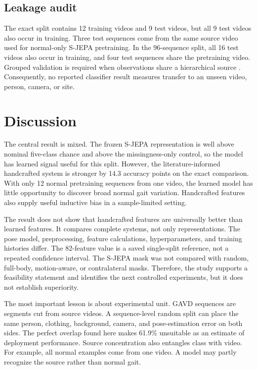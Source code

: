 \documentclass[conference]{IEEEtran}
\begin{document}
\subsection{Leakage audit}
The exact split contains 12 training videos and 9 test videos, but all 9 test videos also occur in training. Three test sequences come from the same source video used for normal-only S-JEPA pretraining. In the 96-sequence split, all 16 test videos also occur in training, and four test sequences share the pretraining video. Grouped validation is required when observations share a hierarchical source \cite{roberts2017crossvalidation}. Consequently, no reported classifier result measures transfer to an unseen video, person, camera, or site.

\section{Discussion}
The central result is mixed. The frozen S-JEPA representation is well above nominal five-class chance and above the missingness-only control, so the model has learned signal useful for this split. However, the literature-informed handcrafted system is stronger by 14.3 accuracy points on the exact comparison. With only 12 normal pretraining sequences from one video, the learned model has little opportunity to discover broad normal gait variation. Handcrafted features also supply useful inductive bias in a sample-limited setting.

The result does not show that handcrafted features are universally better than learned features. It compares complete systems, not only representations. The pose model, preprocessing, feature calculations, hyperparameters, and training histories differ. The 82-feature value is a saved single-split reference, not a repeated confidence interval. The S-JEPA mask was not compared with random, full-body, motion-aware, or contralateral masks. Therefore, the study supports a feasibility statement and identifies the next controlled experiments, but it does not establish superiority.

The most important lesson is about experimental unit. GAVD sequences are segments cut from source videos. A sequence-level random split can place the same person, clothing, background, camera, and pose-estimation error on both sides. The perfect overlap found here makes 61.9\% unsuitable as an estimate of deployment performance. Source concentration also entangles class with video. For example, all normal examples come from one video. A model may partly recognize the source rather than normal gait.
\end{document}
